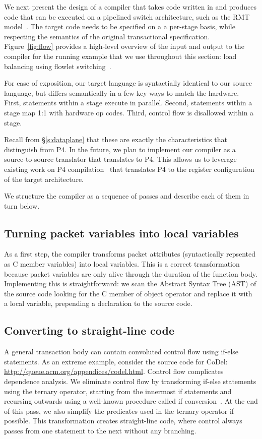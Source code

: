 We next present the design of a compiler that takes code written in \pktlanguage{}
and produces code that can be executed on a pipelined switch architecture, such
as the RMT model~\cite{rmt}. The target code needs to be specified on a a
per-stage basis, while respecting the semantics of the original transactional
specification.  Figure~\ref{fig:flow} provides a high-level overview of
the input and output to the compiler for the running example that we use
throughout this section: load balancing using flowlet
switching~\cite{dina_flowlets}.

For ease of exposition, our target language is syntactially identical to our
source language, but differs semantically in a few key ways to match the
hardware. First, statements within a stage execute in parallel. Second,
statements within a stage map 1:1 with hardware op codes. Third, control flow
is disallowed within a stage.

Recall from \S\ref{s:dataplane} that these are exactly the characteristics that
distinguish \pktlanguage{} from P4. In the future, we plan to implement our
compiler as a source-to-source translator that translates \pktlanguage{} to P4.
This allows us to leverage existing work on P4
compilation~\cite{lavanya_compiler, brebner, netronome} that translates P4 to
the register configuration of the target architecture.

We structure the compiler as a sequence of passes and describe each of them in
turn below. 

\subsection{Turning packet variables into local variables}
As a first step, the compiler transforms packet attributes (syntactically
repsented as C member variables) into local variables.  This is a correct
transformation because packet variables are only alive through the duration of
the function body. Implementing this is straightforward: we scan the Abstract
Syntax Tree (AST) of the source code looking for the C member of object
operator and replace it with a local variable, prepending a declaration to the
source code.

\subsection{Converting to straight-line code}
A general transaction body can contain convoluted control flow using if-else
statements. As an extreme example, consider the source code for CoDel:
\url{http://queue.acm.org/appendices/codel.html}. Control flow complicates
dependence analysis. We eliminate control flow by transforming if-else
statements using the ternary operator, starting from the innermost if
statements and recursing outwards using a well-known procedure called if
conversion~\cite{allen_if_conversion}. At the end of this pass, we also
simplify the predicates used in the ternary operator if possible. This
transformation creates straight-line code, where control always passes from one
statement to the next without any branching.

